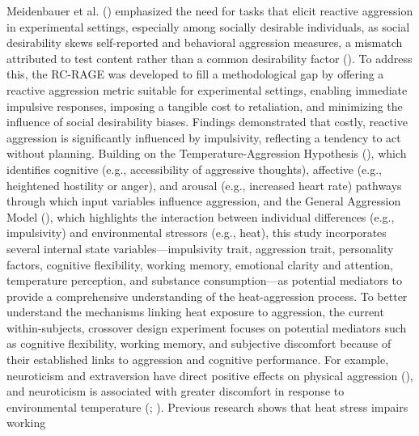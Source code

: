 \documentclass[
  man,
  floatsintext,
  longtable,
  nolmodern,
  notxfonts,
  notimes,
  colorlinks=true,linkcolor=blue,citecolor=blue,urlcolor=blue]{apa7}
\begin{document}
Meidenbauer et al.
()
emphasized the need for tasks that elicit reactive aggression in
experimental settings, especially among socially desirable individuals,
as social desirability skews self-reported and behavioral aggression
measures, a mismatch attributed to test content rather than a common
desirability factor
(). To address this, the RC-RAGE was developed to fill a
methodological gap by offering a reactive aggression metric suitable for
experimental settings, enabling immediate impulsive responses, imposing
a tangible cost to retaliation, and minimizing the influence of social
desirability biases. Findings demonstrated that costly, reactive
aggression is significantly influenced by impulsivity, reflecting a
tendency to act without planning. Building on the Temperature-Aggression
Hypothesis (), which identifies cognitive (e.g., accessibility of
aggressive thoughts), affective (e.g., heightened hostility or anger),
and arousal (e.g., increased heart rate) pathways through which input
variables influence aggression, and the General Aggression Model
(), which highlights the interaction between individual differences
(e.g., impulsivity) and environmental stressors (e.g., heat), this study
incorporates several internal state variables---impulsivity trait,
aggression trait, personality factors, cognitive flexibility, working
memory, emotional clarity and attention, temperature perception, and
substance consumption---as potential mediators to provide a
comprehensive understanding of the heat-aggression process. To better
understand the mechanisms linking heat exposure to aggression, the
current within-subjects, crossover design experiment focuses on
potential mediators such as cognitive flexibility, working memory, and
subjective discomfort because of their established links to aggression
and cognitive performance. For example, neuroticism and extraversion
have direct positive effects on physical aggression
(), and neuroticism is associated with greater
discomfort in response to environmental temperature
(; ). Previous research shows that heat stress impairs working
\end{document}
